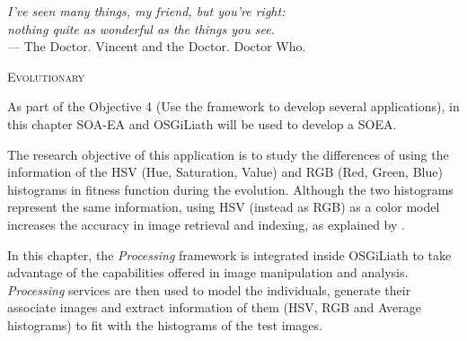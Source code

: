 \label{chap:art}


\begin{flushright}{\slshape
    I've seen many things, my friend, but you're right:
    \\nothing quite as wonderful as the things you see.} \\ \medskip
    --- {The Doctor. Vincent and the Doctor. Doctor Who.}
\end{flushright}


\minitoc\mtcskip
\vfill



\lettrine{E}{volutionary} 

As part of the Objective 4 (Use the framework to develop several applications), in this chapter SOA-EA and OSGiLiath will be used to develop a SOEA. 

The research objective of this application is to study the differences %
of using the information of the HSV (Hue, Saturation, Value) and RGB (Red,
Green, Blue) histograms in fitness function during the evolution. Although the two
histograms represent the same information, using HSV (instead as RGB)
as a color model increases the accuracy in image retrieval and
indexing, as explained by 
\cite{COLORDIFFERENCES}.










In this chapter, the {\em Processing} \cite{PROCESSING} framework is
integrated inside OSGiLiath %
to take advantage of the capabilities offered in image manipulation and analysis. 
{\em Processing} services are then used  to model the
individuals, generate their associate images and extract information
of them (HSV, RGB and Average histograms) to fit with the histograms
of the test images.

